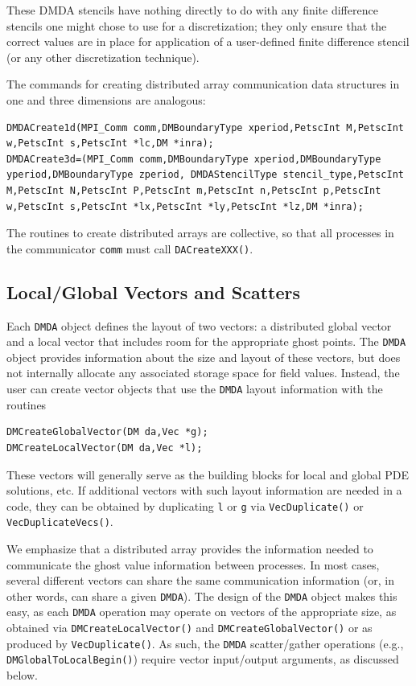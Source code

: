 These DMDA stencils have nothing directly to do with any finite
difference stencils one might chose to use for a discretization; they
only ensure that the correct values are in place for application of a
user-defined finite difference stencil (or any other
discretization technique).

The commands for creating distributed array communication data structures
in one and three dimensions are analogous:
\begin{lstlisting}
DMDACreate1d(MPI_Comm comm,DMBoundaryType xperiod,PetscInt M,PetscInt w,PetscInt s,PetscInt *lc,DM *inra);
DMDACreate3d=(MPI_Comm comm,DMBoundaryType xperiod,DMBoundaryType yperiod,DMBoundaryType zperiod, DMDAStencilType stencil_type,PetscInt M,PetscInt N,PetscInt P,PetscInt m,PetscInt n,PetscInt p,PetscInt w,PetscInt s,PetscInt *lx,PetscInt *ly,PetscInt *lz,DM *inra);
\end{lstlisting}
The routines to create distributed arrays are collective, so that all
processes in the communicator \lstinline{comm} must call \lstinline{DACreateXXX()}.

\subsection{Local/Global Vectors and Scatters}

Each \lstinline{DMDA} object defines the layout of two vectors: a distributed
global vector and a local vector that includes room for the
appropriate ghost points.  The \lstinline{DMDA} object provides information
about the size and layout of these vectors, but does not internally
allocate any associated storage space for field values.  Instead, the
user can create vector objects that use the \lstinline{DMDA} layout
information with the routines
\begin{lstlisting}
DMCreateGlobalVector(DM da,Vec *g);
DMCreateLocalVector(DM da,Vec *l);
\end{lstlisting}
These vectors will generally serve as the building blocks for local
and global PDE solutions, etc.  If additional vectors with such
layout information are needed in a code, they can be obtained by
duplicating \lstinline{l} or \lstinline{g} via
\lstinline{VecDuplicate()} or \lstinline{VecDuplicateVecs()}.

We emphasize that a distributed array provides the information needed
to communicate the ghost value information between processes.  In most
cases, several different vectors can share the same communication
information (or, in other words, can share a given \lstinline{DMDA}).  The
design of the \lstinline{DMDA} object makes this easy, as each \lstinline{DMDA}
operation may operate on vectors of the appropriate size, as obtained
via \lstinline{DMCreateLocalVector()} and \lstinline{DMCreateGlobalVector()} or as
produced by \lstinline{VecDuplicate()}.  As such, the \lstinline{DMDA}
scatter/gather operations (e.g., \lstinline{DMGlobalToLocalBegin()}) require
vector input/output arguments, as discussed below.

